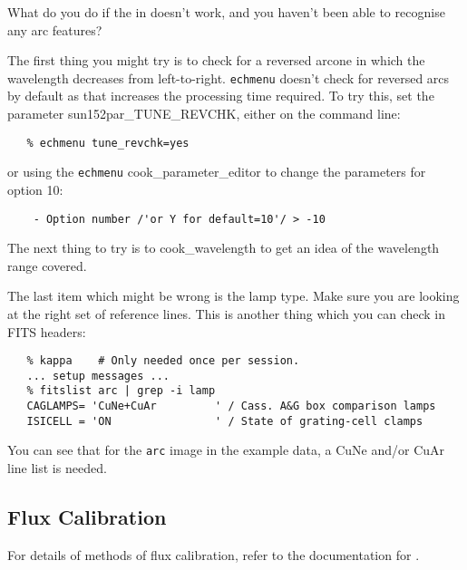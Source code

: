 {{What do you do if the
 in
 doesn't work, and you haven't been
able to recognise any arc features?

The first thing you might try is to check for a reversed
arc\scspec{---}{ - }one in which the wavelength decreases from left-to-right.
\verb+echmenu+ doesn't check for reversed arcs by default as that increases
the processing time required.
To try this, set the parameter 
{sun152}{par_TUNE_REVCHK}, either on the command line:

{
\scspec{\small}{ }
\begin{verbatim}
   % echmenu tune_revchk=yes
\end{verbatim}
}

or using the \verb+echmenu+ 
{cook_parameter_editor} to change the parameters for option 10:

{
\scspec{\small}{ }
\begin{verbatim}
    - Option number /'or Y for default=10'/ > -10
\end{verbatim}
}

The next thing to try is to 
{cook_wavelength} to get an idea of the wavelength range covered.

The last item which might be wrong is the lamp type.  Make sure you are
looking at the right set of reference lines.  This is another thing which
you can check in FITS headers:

{
\scspec{\small}{ }
\begin{verbatim}
   % kappa    # Only needed once per session.
   ... setup messages ...
   % fitslist arc | grep -i lamp
   CAGLAMPS= 'CuNe+CuAr         ' / Cass. A&G box comparison lamps
   ISICELL = 'ON                ' / State of grating-cell clamps
\end{verbatim}
}

You can see that for the \verb+arc+ image in the example data, a
CuNe and/or CuAr line list is needed.


\subsection{Flux Calibration}

For details of methods of flux calibration, refer to
the documentation for 
{}\@.


}}

